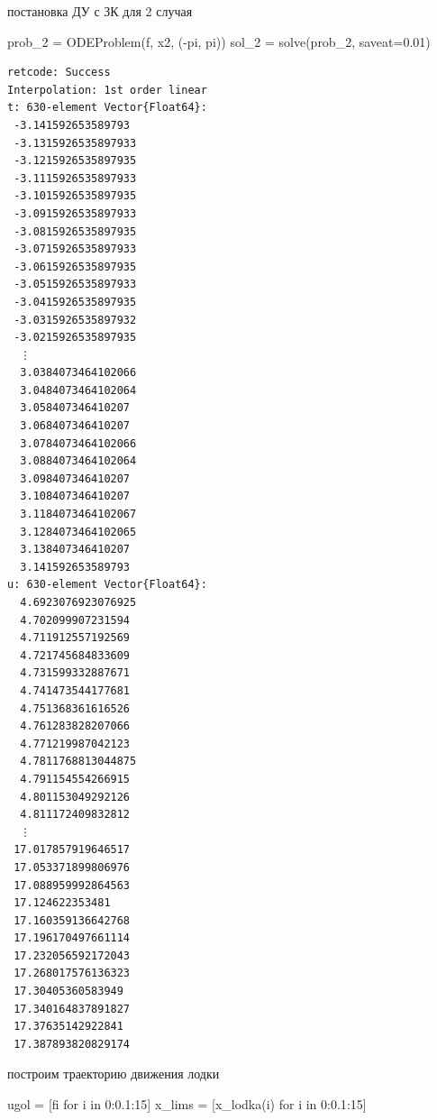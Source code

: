 \documentclass[
  12pt,
  a4paper,
  DIV=11,
  numbers=noendperiod]{scrreprt}
\newenvironment{Shaded}{\begin{snugshade}}{\end{snugshade}}
\newcommand{\ConstantTok}[1]{\textcolor[rgb]{0.56,0.35,0.01}{#1}}
\newcommand{\FloatTok}[1]{\textcolor[rgb]{0.68,0.00,0.00}{#1}}
\newcommand{\FunctionTok}[1]{\textcolor[rgb]{0.28,0.35,0.67}{#1}}
\newcommand{\KeywordTok}[1]{\textcolor[rgb]{0.00,0.23,0.31}{#1}}
\newcommand{\NormalTok}[1]{\textcolor[rgb]{0.00,0.23,0.31}{#1}}
\newcommand{\OperatorTok}[1]{\textcolor[rgb]{0.37,0.37,0.37}{#1}}
\begin{document}
постановка ДУ с ЗК для 2 случая

\begin{Shaded}
\begin{Highlighting}[]
\NormalTok{prob\_2 }\OperatorTok{=} \FunctionTok{ODEProblem}\NormalTok{(f, x2, (}\OperatorTok{{-}}\ConstantTok{pi}\NormalTok{, }\ConstantTok{pi}\NormalTok{))}
\NormalTok{sol\_2 }\OperatorTok{=} \FunctionTok{solve}\NormalTok{(prob\_2, saveat}\OperatorTok{=}\FloatTok{0.01}\NormalTok{)}
\end{Highlighting}
\end{Shaded}

\begin{verbatim}
retcode: Success
Interpolation: 1st order linear
t: 630-element Vector{Float64}:
 -3.141592653589793
 -3.1315926535897933
 -3.1215926535897935
 -3.1115926535897933
 -3.1015926535897935
 -3.0915926535897933
 -3.0815926535897935
 -3.0715926535897933
 -3.0615926535897935
 -3.0515926535897933
 -3.0415926535897935
 -3.0315926535897932
 -3.0215926535897935
  ⋮
  3.0384073464102066
  3.0484073464102064
  3.058407346410207
  3.068407346410207
  3.0784073464102066
  3.0884073464102064
  3.098407346410207
  3.108407346410207
  3.1184073464102067
  3.1284073464102065
  3.138407346410207
  3.141592653589793
u: 630-element Vector{Float64}:
  4.6923076923076925
  4.702099907231594
  4.711912557192569
  4.721745684833609
  4.731599332887671
  4.741473544177681
  4.751368361616526
  4.761283828207066
  4.771219987042123
  4.7811768813044875
  4.791154554266915
  4.801153049292126
  4.811172409832812
  ⋮
 17.017857919646517
 17.053371899806976
 17.088959992864563
 17.124622353481
 17.160359136642768
 17.196170497661114
 17.232056592172043
 17.268017576136323
 17.30405360583949
 17.340164837891827
 17.37635142922841
 17.387893820829174
\end{verbatim}

построим траекторию движения лодки

\begin{Shaded}
\begin{Highlighting}[]
\NormalTok{ugol }\OperatorTok{=}\NormalTok{ [fi for i }\KeywordTok{in} \FloatTok{0}\OperatorTok{:}\FloatTok{0.1}\OperatorTok{:}\FloatTok{15}\NormalTok{]}
\NormalTok{x\_lims }\OperatorTok{=}\NormalTok{ [}\FunctionTok{x\_lodka}\NormalTok{(i) for i }\KeywordTok{in} \FloatTok{0}\OperatorTok{:}\FloatTok{0.1}\OperatorTok{:}\FloatTok{15}\NormalTok{]}
\end{Highlighting}
\end{Shaded}
\end{document}
